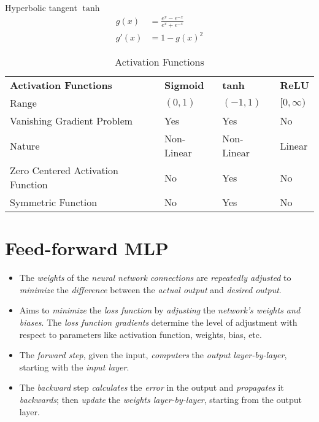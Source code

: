 \documentclass[
	number={8},
	title={Artificial Neural Network}
]{cs584notes}
\begin{document}
Hyperbolic tangent $\tanh$
\begin{equation}
	\begin{aligned}
		g(x) &= \frac{e^{x} - e^{-x}}{e^{x} + e^{-x}}\\
		g'(x) &= 1 - g(x)^{2}
	\end{aligned}
	\label{eq:tanh}
\end{equation}

\begin{table}[H]
	\centering
	\caption{Activation Functions}
	\label{tab:activation-functions}
	\begin{tabular}{l l l l}
		\textbf{Activation Functions} & \textbf{Sigmoid} & \textbf{tanh} & \textbf{ReLU}\\
		Range & $(0, 1)$ & $(-1, 1)$ & $[0, \infty)$ \\
		Vanishing Gradient Problem & Yes & Yes & No\\
		Nature & Non-Linear & Non-Linear & Linear\\
		Zero Centered Activation Function & No & Yes & No\\
		Symmetric Function & No & Yes & No
	\end{tabular}
\end{table}

\section{Feed-forward MLP}\label{sec:feed-forward-mlp}
\begin{itemize}
	\item The \emph{weights} of the \emph{neural network connections} are \emph{repeatedly adjusted} to \emph{minimize} the \emph{difference} between the \emph{actual output} and \emph{desired output}.
	\item Aims to \emph{minimize} the \emph{loss function} by \emph{adjusting} the \emph{network's weights and biases}.
	The \emph{loss function gradients} determine the level of adjustment with respect to parameters like activation function, weights, bias, etc.
	\item The \emph{forward step}, given the input, \emph{computers} the \emph{output layer-by-layer}, starting with the \emph{input layer}.
	\item The \emph{backward} step \emph{calculates} the \emph{error} in the output and \emph{propagates} it \emph{backwards}; then \emph{update} the \emph{weights layer-by-layer}, starting from the output layer.
\end{itemize}
\end{document}
